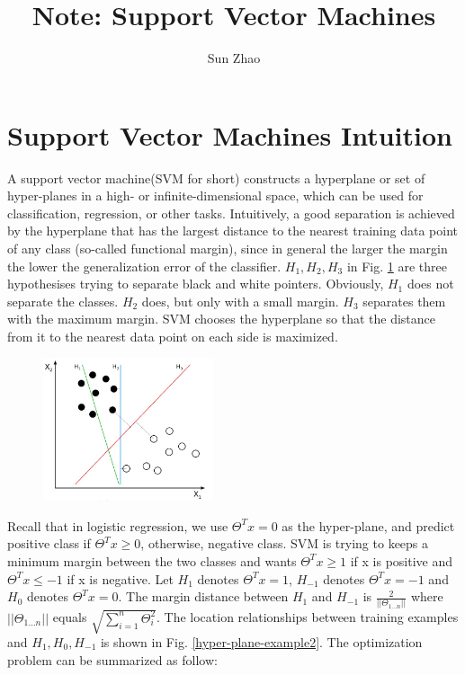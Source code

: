 \documentclass{article}
\title{Note: Support Vector Machines}
\author{Sun Zhao}
\begin{document}
\maketitle
\newpage

\section{Support Vector Machines Intuition}
 A support vector machine(SVM for short) constructs a hyperplane or set of hyper-planes in a high- or infinite-dimensional space, which can be used for classification, regression, or other tasks. Intuitively, a good separation is achieved by the hyperplane that has the largest distance to the nearest training data point of any class (so-called functional margin), since in general the larger the margin the lower the generalization error of the classifier. $H_{1}, H_{2}, H_{3}$ in Fig. \ref{hyper-plane-example1} are three hypothesises trying to separate black and white pointers. Obviously, $H_{1}$ does not separate the classes. $H_{2}$ does, but only with a small margin. $H_{3}$ separates them with the maximum margin. SVM chooses the hyperplane so that the distance from it to the nearest data point on each side is maximized.
\begin{figure}[ht]
  \centering
  \includegraphics[width=5cm]{Figure1.jpg}\\
  \caption{}\label{hyper-plane-example1}
\end{figure}
 Recall that in logistic regression, we use $\Theta^{T}x = 0$ as the hyper-plane, and predict positive class if $\Theta^{T}x \ge 0$, otherwise, negative class. SVM is trying to keeps a minimum margin between the two classes and wants $\Theta^{T}x \ge 1$ if x is positive and $\Theta^{T}x \le -1$ if x is negative. Let $H_{1}$ denotes $\Theta^{T}x = 1$, $H_{-1}$ denotes $\Theta^{T}x = -1$ and $H_{0}$ denotes $\Theta^{T}x = 0$. The margin distance between $H_{1}$ and $H_{-1}$ is $\frac{2}{||\Theta_{1 \ldots n}||}$ where $||\Theta_{1 \ldots n}||$ equals $\sqrt{\sum_{i = 1}^{n} \Theta_{i}^{2}}$. The location relationships between training examples and $H_{1}, H_{0}, H_{-1}$ is shown in Fig. \ref{hyper-plane-example2}. The optimization problem can be summarized as follow:\\
\end{document}
